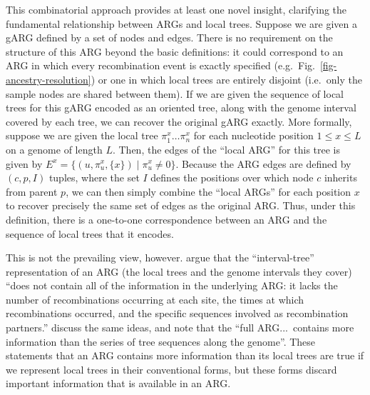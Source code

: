 \documentclass[9pt,twocolumn,twoside]{gsajnl}
\begin{document}
This combinatorial approach provides at least
one novel insight, clarifying the fundamental relationship between
ARGs and local trees.
Suppose we are given a gARG defined by a set of nodes and edges.
There is no requirement on the structure of this ARG beyond
the basic definitions: it could correspond to an ARG in which
every recombination event is exactly specified
(e.g.\ Fig.~\ref{fig-ancestry-resolution})
or one in which local trees are entirely disjoint
(i.e.\ only the sample nodes are shared between them).
If we  are given the sequence of local trees for this gARG
encoded as an oriented tree, along with the genome interval
covered by each tree, we can recover the original gARG exactly.
More formally, suppose we are given the local tree $\pi^x_1\dots\pi^x_n$
for each nucleotide position $1 \leq x \leq L$ on a genome of length $L$.
Then, the edges of the ``local ARG'' for this tree is given by
$E^x = \{(u, \pi_u^x, \{x\}) \mid \pi_u^x \neq 0\}$. Because the ARG
edges are defined by $(c, p, I)$ tuples, where the set $I$ defines
the positions over which node $c$ inherits from parent $p$, we can
then simply combine the ``local ARGs'' for each position $x$
to recover precisely the same set of edges as the original ARG.
Thus, under this definition, there
is a one-to-one correspondence between an ARG and
the sequence of local trees that it encodes.

This is not the prevailing view, however.
\cite{kuhner2017consensus} argue that the
``interval-tree'' representation of
an ARG (the local trees and the genome intervals they cover)
``does not contain all of the information in the underlying ARG: it lacks the
number of recombinations occurring at each site, the times at which
recombinations occurred, and the specific sequences involved as recombination
partners.''
\cite{shipilina2023origin} discuss the same ideas,
and note that the
``full ARG...~contains more information than the series of tree
sequences along the genome''.
These
%
statements that an ARG
contains more information than its local trees are true
if we represent local trees in their conventional forms,
but these forms discard important information that is
available in an ARG.
\end{document}

